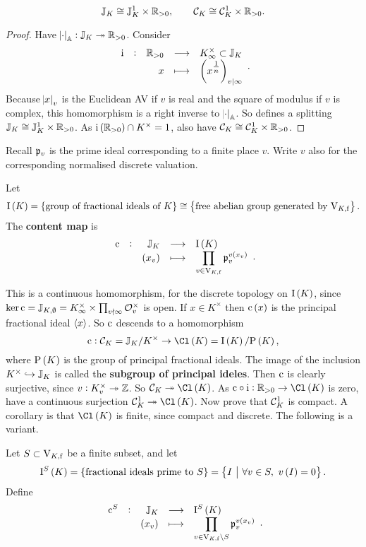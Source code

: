 \begin{proposition}
$$ \mathbb{J}_K \cong \mathbb{J}_K^1 \times \mathbb{R}_{> 0}, \qquad \mathcal{C}_K \cong \mathcal{C}_K^1 \times \mathbb{R}_{> 0}. $$
\end{proposition}

\begin{proof}
Have $ \abs{\cdot}_{\mathbb{A}} : \mathbb{J}_K \twoheadrightarrow \mathbb{R}_{> 0} $. Consider
$$ \function[\i]{\RR_{> 0}}{K_\infty^\times \subset \JJ_K}{x}{\br{x^{\tfrac{1}{n}}}_{v \mid \infty}}. $$
Because $ \abs{x}_v $ is the Euclidean AV if $ v $ is real and the square of modulus if $ v $ is complex, this homomorphism is a right inverse to $ \abs{\cdot}_{\mathbb{A}} $. So defines a splitting $ \mathbb{J}_K \cong \mathbb{J}_K^1 \times \mathbb{R}_{> 0} $. As $ \i\br{\RR_{> 0}} \cap K^\times = 1 $, also have $ \mathcal{C}_K \cong \mathcal{C}_K^1 \times \mathbb{R}_{> 0} $.
\end{proof}

Recall $ \mathfrak{p}_v $ is the prime ideal corresponding to a finite place $ v $. Write $ v $ also for the corresponding normalised discrete valuation.

\begin{definition*}
Let
$$ \I\br{K} = \cbr{\text{group of fractional ideals of} \ K} \cong \cbr{\text{free abelian group generated by} \ \V_{K, \f}}. $$
The \textbf{content map} is
$$ \function[\c]{\JJ_K}{\I\br{K}}{\br{x_v}}{\prod_{v \in \V_{K, \f}} \ppp_v^{v\br{x_v}}}. $$
\end{definition*}

This is a continuous homomorphism, for the discrete topology on $ \I\br{K} $, since $ \ker \mathrm{c} = \mathbb{J}_{K, \emptyset} = K_\infty^\times \times \prod_{v \nmid \infty} \mathcal{O}_v^\times $ is open. If $ x \in K^\times $ then $ \c\br{x} $ is the principal fractional ideal $ \left\langle x \right\rangle $. So $ \mathrm{c} $ descends to a homomorphism
$$ \c : \CCC_K = \JJ_K / K^\times \to \Cl\br{K} = \I\br{K} / \P\br{K}, $$
where $ \P\br{K} $ is the group of principal fractional ideals. The image of the inclusion $ K^\times \hookrightarrow \mathbb{J}_K $ is called the \textbf{subgroup of principal ideles}. Then $ \mathrm{c} $ is clearly surjective, since $ v : K_v^\times \twoheadrightarrow \mathbb{Z} $. So $ \CCC_K \twoheadrightarrow \Cl\br{K} $. As $ \c \circ \i : \RR_{> 0} \to \Cl\br{K} $ is zero, have a continuous surjection $ \CCC_K^1 \twoheadrightarrow \Cl\br{K} $. Now prove that $ \mathcal{C}_K^1 $ is compact. A corollary is that $ \Cl\br{K} $ is finite, since compact and discrete. The following is a variant.

\begin{definition*}
Let $ S \subset \mathrm{V}_{K, \mathrm{f}} $ be a finite subset, and let
$$ \I^S\br{K} = \cbr{\text{fractional ideals prime to} \ S} = \cbr{I \st \forall v \in S, \ v\br{I} = 0}. $$
Define
$$ \function[\c^S]{\JJ_K}{\I^S\br{K}}{\br{x_v}}{\prod_{v \in \V_{K, \f} \setminus S} \ppp_v^{v\br{x_v}}}. $$
\end{definition*}

